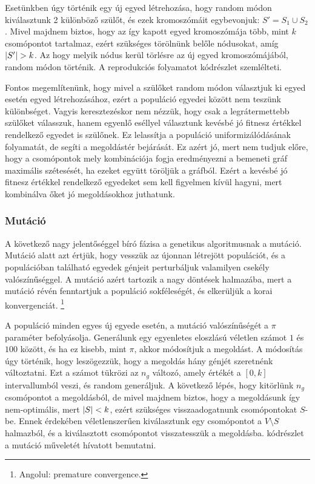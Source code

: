Esetünkben úgy történik egy új egyed létrehozása, hogy random módon kiválasztunk 2 különböző szülőt,
és ezek kromoszómáit egybevonjuk: $S' = S_{1} \cup S_{2}$.
Mivel majdnem biztos, hogy az így kapott egyed kromoszómája több, mint $k$ csomópontot tartalmaz,
ezért szükséges törölnünk belőle nódusokat, amíg $\lvert S'\rvert > k$.
Az hogy melyik nódus kerül törlésre az új egyed kromoszómájából, random módon történik.
A reprodukciós folyamatot  kódrészlet szemlélteti.


Fontos megemlítenünk, hogy mivel a szülőket random módon választjuk ki  egyed esetén egyed létrehozásához,
ezért a populáció egyedei között nem teszünk különbséget.
Vagyis keresztezéskor nem nézzük, hogy csak a legrátermettebb szülőket válasszuk,
hanem egyenlő eséllyel választunk kevésbé jó fitnesz értékkel rendelkező egyedet is szülőnek.
Ez lelassítja a populáció uniformizálódásának folyamatát, de segíti a megoldástér bejárását.
Ez azért jó, mert nem tudjuk előre, hogy a csomópontok mely kombinációja
fogja eredményezni a bemeneti gráf maximális szétesését, ha ezeket együtt töröljük a gráfból.
Ezért a kevésbé jó fitnesz értékkel rendelkező egyedeket sem kell figyelmen kívül hagyni,
mert kombinálva őket jó megoldásokhoz juthatunk.


\subsubsection{Mutáció}
A következő nagy jelentőséggel bíró fázisa a genetikus algoritmusnak a mutáció.
Mutáció alatt azt értjük, hogy vesszük az újonnan létrejött populációt,
és a populációban található egyedek génjeit perturbáljuk valamilyen csekély valószínűséggel.
A mutáció azért tartozik a nagy döntések halmazába,
mert a mutáció révén fenntartjuk a populáció sokféleségét, és elkerüljük a korai konvergenciát.
\footnote{
  Angolul: premature convergence.
}

A populáció minden egyes új egyede esetén, a mutáció valószínűségét a $\pi$ paraméter befolyásolja.
Generálunk egy egyenletes eloszlású véletlen számot $1$ és $100$ között, és ha ez kisebb, mint $\pi$, akkor módosítjuk a megoldást.
A módosítás úgy történik, hogy leszögezzük, hogy a megoldás hány génjét szeretnénk változtatni.
Ezt a számot tükrözi az $n_{g}$ változó, amely értékét a $\left[0, k\right]$ intervallumból veszi, és random generáljuk.
A következő lépés, hogy kitörlünk $n_{g}$ csomópontot a megoldásból, de mivel majdnem biztos,
hogy a megoldásunk így nem-optimális, mert $\lvert S\rvert < k$, ezért szükséges visszaadogatnunk csomópontokat $S$-be.
Ennek érdekében véletlenszerűen kiválasztunk egy csomópontot a $V \setminus S$ halmazból,
és a kiválasztott csomópontot visszatesszük a megoldásba.
 kódrészlet a mutáció műveletét hívatott bemutatni.



